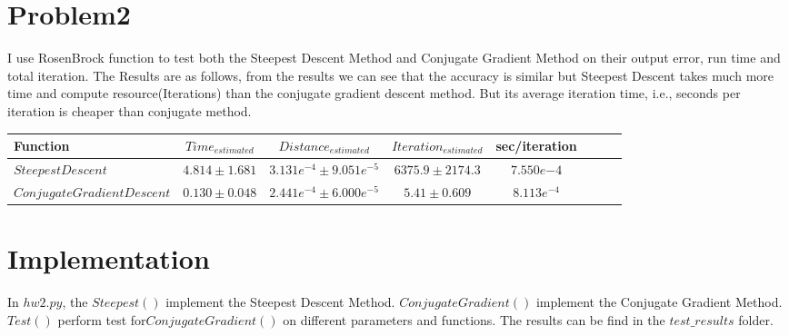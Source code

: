 \documentclass[11pt]{article}
\begin{document}
\section{Problem2}
I use RosenBrock function to test both the Steepest Descent Method and Conjugate Gradient Method on their output error, run time and total iteration. The Results are as follows, from the results we can see that the accuracy is similar but Steepest Descent takes much more time and compute resource(Iterations) than the conjugate gradient descent method. But its average iteration time, i.e., seconds per iteration is cheaper than conjugate method.
\begin{center} 
\begin{tabular}{l*{6}{c}r} Function &  $Time_{estimated}$ & $Distance_{estimated}$ & $Iteration_{estimated}$ & sec/iteration
 \\ \hline $Steepest Descent$ &  $4.814\pm 1.681$ & $3.131e^{-4}\pm 9.051e^{-5}$ & $6375.9\pm 2174.3$ & $7.550e{-4}$
\\ $Conjugate Gradient Descent$ & $0.130\pm 0.048$ & $2.441e^{-4}\pm 6.000e^{-5}$ & $5.41\pm 0.609$ & $8.113e^{-4}$
\\ \end{tabular}
 \end{center}
\section{Implementation}
In $hw2.py$,  the $Steepest()$ implement the Steepest Descent Method. $ConjugateGradient()$ implement the Conjugate Gradient Method. $Test()$ perform test for$ ConjugateGradient()$ on different parameters and functions. The results can be find in the $test\_results$ folder.
\end{document}
